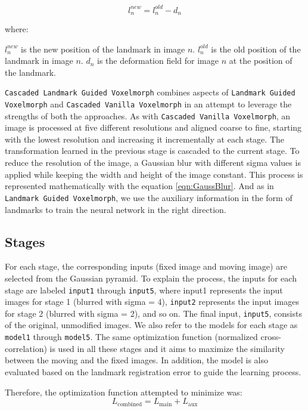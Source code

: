 \documentclass{book}
\begin{document}
	\begin{equation}\label{eq:ldm_prop}
		l_n^{new} = l_n^{old} - d_n
	\end{equation}
	
	where:
	
	$l_n^{new}$ is the new position of the landmark in image $n$. $l_n^{old}$ is the old position of the landmark in image $n$. $d_n$ is the deformation field for image $n$ at the position of the landmark.
	
	\texttt{Cascaded Landmark Guided Voxelmorph} combines aspects of \texttt{Landmark Guided Voxelmorph} and \texttt{Cascaded Vanilla Voxelmorph} in an attempt to leverage the strengths of both the approaches. As with \texttt{Cascaded Vanilla Voxelmorph}, an image is processed at five different resolutions and aligned coarse to fine, starting with the lowest resolution and increasing it incrementally at each stage. The transformation learned in the previous stage is cascaded to the current stage. To reduce the resolution of the image, a Gaussian blur with different sigma values is applied while keeping the width and height of the image constant. This process is represented mathematically with the equation \ref{eqn:GaussBlur}. And as in \texttt{Landmark Guided Voxelmorph}, we use the auxiliary information in the form of landmarks to train the neural network in the right direction.
	
	\subsection{Stages}
	For each stage, the corresponding inputs (fixed image and moving image) are selected from the Gaussian pyramid. To explain the process, the inputs for each stage are labeled \texttt{input1} through \texttt{input5}, where input1 represents the input images for stage 1 (blurred with sigma = 4), \texttt{input2} represents the input images for stage 2 (blurred with sigma = 2), and so on. The final input, \texttt{input5}, consists of the original, unmodified images. We also refer to the models for each stage as \texttt{model1} through \texttt{model5}. The same optimization function (normalized cross-correlation) is used in all these stages and it aims to maximize the similarity between the moving and the fixed images. In addition, the model is also evaluated based on the landmark registration error to guide the learning process.
	
	Therefore, the optimization function attempted to minimize was:
	\begin{equation}\label{eq:aux_loss_combined}
		L_\text{combined} = L_\text{main} + L_\text{aux}
	\end{equation}
	
\end{document}
